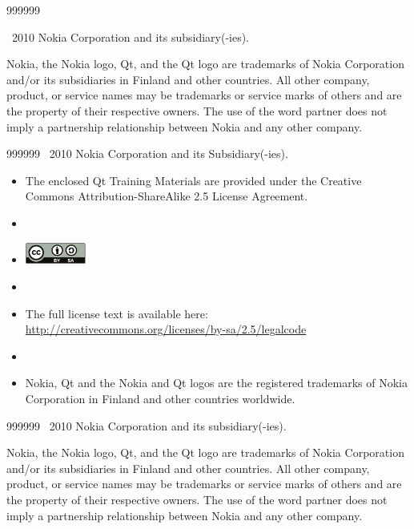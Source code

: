 \begin{slide}{999999}

\vspace{5em}
\textcopyright~2010 Nokia Corporation and its subsidiary(-ies).

\vspace{2em}
{\small Nokia, the Nokia logo, Qt, and the Qt logo are trademarks of Nokia
Corporation and/or its subsidiaries in Finland and other countries.
All other company, product, or service names may be trademarks or service marks
of others and are the property of their respective owners. The use of the word
partner does not imply a partnership relationship between Nokia and any other
company.}

\end{slide}

{
  
  \begin{slide}{999999}
    \vspace{5em}
    \textcopyright~2010 Nokia Corporation and its Subsidiary(-ies).    
    \vspace{2em}                                                     
    \begin{itemize}
      \item[] \footnotesize{The enclosed Qt Training Materials are provided under the
        Creative Commons Attribution-ShareAlike 2.5 License Agreement.}
      \item[]
      \item[] \mbox{\includegraphics[width=20mm]{images/cc-by-sa}}
      \item[]
      \item[] \footnotesize{The full license text is available here:  
      \url{http://creativecommons.org/licenses/by-sa/2.5/legalcode}}
      \item[]    
      \item[] \footnotesize{Nokia, Qt and the Nokia and Qt logos are the registered trademarks 
      of Nokia Corporation in Finland and other countries worldwide.}
    \end{itemize}
    
  \end{slide}
  
} %
{ %
  
  \begin{slide}{999999}
    \vspace{5em}
    \textcopyright~2010 Nokia Corporation and its subsidiary(-ies).
    
    \vspace{2em}
    {\small Nokia, the Nokia logo, Qt, and the Qt logo are trademarks of Nokia
      Corporation and/or its subsidiaries in Finland and other countries.
      All other company, product, or service names may be trademarks or service marks
      of others and are the property of their respective owners. The use of the word
      partner does not imply a partnership relationship between Nokia and any other
      company.}
    
  \end{slide}
}
